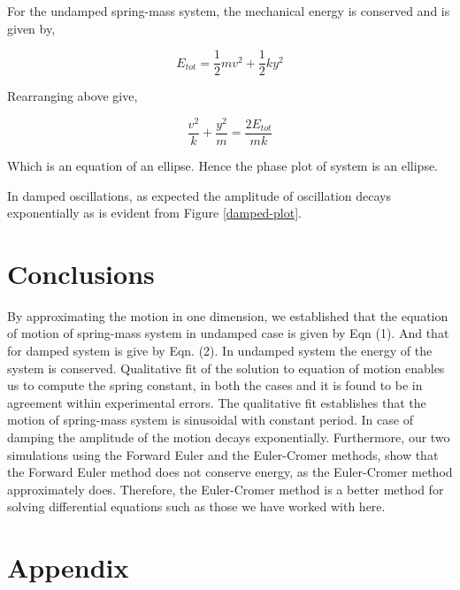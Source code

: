 \documentclass[letterpaper,12pt]{article}
\begin{document}
For the undamped spring-mass system, the mechanical energy is conserved and is given by,

$$E_{tot} = \frac{1}{2}mv^2 + \frac{1}{2}ky^2$$

Rearranging above give,

$$\frac{v^2}{k} + \frac{y^2}{m} = \frac{2E_{tot}}{mk}$$

Which is an equation of an ellipse. Hence the phase plot of system is an ellipse.

In damped oscillations, as expected the amplitude of oscillation decays exponentially as is evident
from Figure \ref{damped-plot}.

\section{Conclusions}

By approximating the motion in one dimension, we established that the equation of motion of spring-mass 
system in undamped case is given by Eqn (1). And that for damped system is give by Eqn. (2). In undamped 
system the energy of the system is conserved. Qualitative fit of the solution to equation of motion 
enables us to compute the spring constant, in both the cases and it is found to be in agreement within experimental errors.
The qualitative fit establishes that the motion of spring-mass system is sinusoidal with constant period. In 
case of damping the amplitude of the motion decays exponentially. Furthermore, our two simulations using the Forward Euler and the Euler-Cromer methods, show that the Forward Euler method does not conserve energy, as the Euler-Cromer method approximately does. Therefore, the Euler-Cromer method is a better method for solving differential equations such as those we have worked with here.

\pagebreak

\appendix

\section{Appendix}
\end{document}
